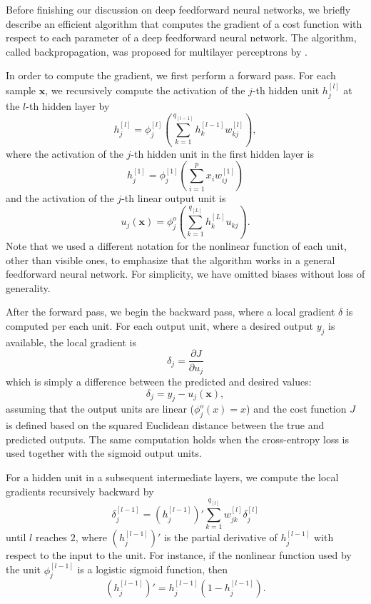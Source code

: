 \documentclass{now}
\newcommand{\qlay}[1]{\left[#1\right]}
\newcommand{\vect}[1]{\mathbf{#1}}
\newcommand{\vx}[0]{\vect{x}}
\begin{document}
Before finishing our discussion on deep feedforward neural networks, we briefly
describe an efficient algorithm that computes the gradient of a cost function
with respect to each parameter of a deep feedforward neural network. The
algorithm, called backpropagation, was proposed for multilayer perceptrons by
\citet{Werbos1974,Rumelhart1986}. 

In order to compute the gradient, we first perform a forward pass. For each
sample $\vx$, we recursively compute the activation of the $j$-th hidden unit
$h_j^{\qlay{l}}$ at the $l$-th hidden layer by
\[
h_j^{\qlay{l}} = \phi_j^{\qlay{l}}
\left(\sum_{k=1}^{q_{\qlay{l-1}}} h_k^{\qlay{l-1}}
w_{kj}^{\qlay{l}}\right),
\]
where the activation of the $j$-th hidden unit in the first hidden layer is
\[
h_j^{\qlay{1}} = \phi_j^{\qlay{1}} \left(\sum_{i=1}^p x_i
w_{ij}^{\qlay{1}}\right)
\]
and the activation of the $j$-th linear output unit is 
\[
u_j(\vx) = \phi_j^{o} \left( \sum_{k=1}^{q_{\qlay{L}}}
h_{k}^{\qlay{L}} u_{kj}
\right).
\]
Note that we used a different notation for the nonlinear function of each unit,
other than visible ones, to emphasize that the algorithm works in a general
feedforward neural network.  For simplicity, we have omitted biases without loss
of generality.

After the forward pass, we begin the backward pass, where a local gradient
$\delta$ is computed per each unit.  For each output unit, where a desired
output $y_j$ is available, the local gradient is
\[
\delta_j = \frac{\partial J}{\partial u_j} 
\]
which is simply a difference between the predicted and desired values:
\[
\delta_j = y_j - u_j(\vx),
\]
assuming that the output units are linear ($\phi_j^o(x) = x$) and the cost
function $J$ is defined based on the squared Euclidean distance between the true
and predicted outputs. The same computation holds when the cross-entropy loss is
used together with the sigmoid output units.

For a hidden unit in a subsequent intermediate layers, we compute the local
gradients recursively backward by
\[
\delta_j^{\qlay{l-1}} = \left(h_j^{\qlay{l-1}}\right)'
\sum_{k=1}^{q_{\qlay{l}}}
w_{jk}^{\qlay{l}} \delta_j^{\qlay{l}}
\]
until $l$ reaches $2$, where $\left(h_j^{\qlay{l-1}}\right)'$ is the partial
derivative of $h_j^{\qlay{l-1}}$ with respect to the input to the unit. For
instance, if the nonlinear function used by the unit $\phi_j^{\qlay{l-1}}$ is a
logistic sigmoid function, then
\[
\left(h_j^{\qlay{l-1}}\right)' = h_j^{\qlay{l-1}} \left( 1 -
h_j^{\qlay{l-1}} \right).
\]
\end{document}
